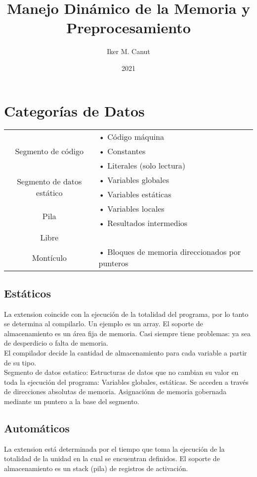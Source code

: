 \documentclass[11pt,a4paper]{article}
\author{Iker M. Canut}
\title{Manejo Dinámico de la Memoria y Preprocesamiento}
\date{2021}
\begin{document}
\maketitle
\newpage

\section{Categor\'ias de Datos}
\begin{table}[h]
\centering
\begin{tabular}{cl}
\hline
\multirow{3}{*}{Segmento de c\'odigo}
	&• C\'odigo m\'aquina\\
    &• Constantes\\
	&• Literales (solo lectura)\\
\hline
\multirow{2}{*}{Segmento de datos est\'atico}
	&• Variables globales\\
    &• Variables est\'aticas\\
\hline
\multirow{2}{*}{Pila}
	&• Variables locales\\
    &• Resultados intermedios\\
\hline
Libre\\
\hline
\multirow{1}{*}{Mont\'iculo}
	&• Bloques de memoria direccionados por punteros\\
\hline
\end{tabular}
\end{table}

\subsection{Est\'aticos}
La extension coincide con la ejecuci\'on de la totalidad del programa, por lo tanto se determina al compilarlo. Un ejemplo es un array. El soporte de almacenamiento es un \'area fija de memoria. Casi siempre tiene problemas: ya sea de desperdicio o falta de memoria.\\

El compilador decide la cantidad de almacenamiento para cada variable a partir de su tipo.\\

Segmento de datos estatico: Estructuras de datos que no cambian su valor en toda la ejecuci\'on del programa: Variables globales, est\'aticas. Se acceden a trav\'es de direcciones absolutas de memoria. Asignaci\'onn de memoria gobernada mediante un puntero a la base del segmento.

\subsection{Autom\'aticos}
La extension est\'a determinada por el tiempo que toma la ejecuci\'on de la totalidad de la unidad en la cual se encuentran definidos. El soporte de almacenamiento es un stack (pila) de registros de activaci\'on.\\
\end{document}
